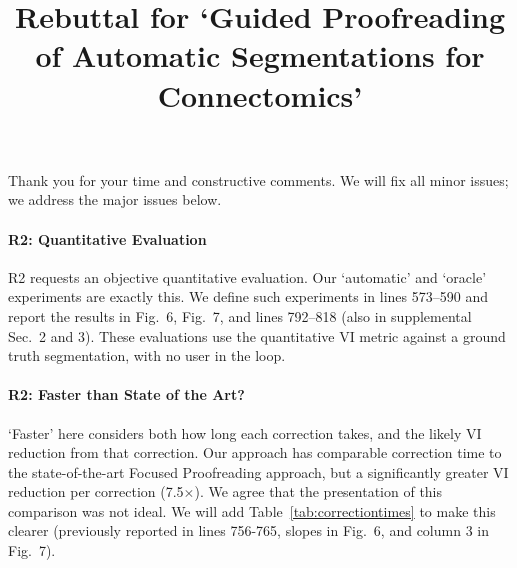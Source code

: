 \documentclass[10pt,twocolumn,letterpaper]{article}
\begin{document}
\title{Rebuttal for `Guided Proofreading of Automatic Segmentations for Connectomics'}  %

\maketitle
\thispagestyle{empty}

Thank you for your time and constructive comments. We will fix all minor issues; we address the major issues below.

\vspace{-1mm}

\paragraph{R2: Quantitative Evaluation}
R2 requests an objective quantitative evaluation. Our `automatic' and `oracle' experiments are exactly this. We define such experiments in lines 573--590 and report the results in Fig.~6, Fig.~7, and lines 792--818 (also in supplemental Sec.~2 and 3). These evaluations use the quantitative VI metric against a ground truth segmentation, with no user in the loop.

\vspace{-1mm}

\paragraph{R2: Faster than State of the Art?}
`Faster' here considers both how long each correction takes, and the likely VI reduction from that correction. Our approach has comparable correction time to the state-of-the-art Focused Proofreading approach, but a significantly greater VI reduction per correction (7.5$\times$). We agree that the presentation of this comparison was not ideal. We will add Table~\ref{tab:correctiontimes} to make this clearer (previously reported in lines 756-765, slopes in Fig.~6, and column 3 in Fig.~7).
\end{document}
